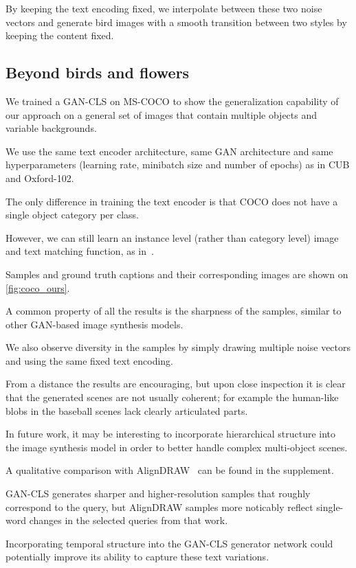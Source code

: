 By keeping the text encoding fixed, we interpolate between these two noise vectors and generate bird images with a smooth transition between two styles by keeping the content fixed.

\subsection{Beyond birds and flowers}

We trained a GAN-CLS on MS-COCO to show the generalization capability of our approach on a general set of images that contain multiple objects and variable backgrounds.

We use the same text encoder architecture, same GAN architecture and same hyperparameters (learning rate, minibatch size and number of epochs) as in CUB and Oxford-102.  

The only difference in training the text encoder is that COCO does not have a single object category per class.

However, we can still learn an instance level (rather than category level) image and text matching function, as in~\cite{kiros2014unifying}.

Samples and ground truth captions and their corresponding images are shown on \autoref{fig:coco_ours}.

A common property of all the results is the sharpness of the samples, similar to other GAN-based image synthesis models. 

We also observe diversity in the samples by simply drawing multiple noise vectors and using the same fixed text encoding.

From a distance the results are encouraging, but upon close inspection it is clear that the generated scenes are not usually coherent; for example the human-like blobs in the baseball scenes lack clearly articulated parts.

In future work, it may be interesting to incorporate hierarchical structure into the image synthesis model in order to better handle complex multi-object scenes.

A qualitative comparison with AlignDRAW~\citep{mansimov2015generating} can be found in the supplement.

GAN-CLS generates sharper and higher-resolution samples that roughly correspond to the query, but AlignDRAW samples more noticably reflect single-word changes in the selected queries from that work.

Incorporating temporal structure into the GAN-CLS generator network could potentially improve its ability to capture these text variations.

